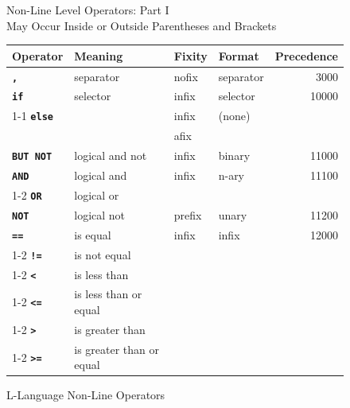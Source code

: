 \documentclass[12pt]{article}
\newcommand{\ttkey}[1]{{\tt \bfseries #1}}
\newlength{\figurewidth}
\newenvironment{boxedfigure}[1][!btp]%
	{\begin{figure}[#1]
	 \begin{lrbox}{\figurebox}
	 \begin{minipage}{\figurewidth}

	 \vspace*{1ex}}%
	{
	 \vspace*{1ex}

	 \end{minipage}
	 \end{lrbox}

	 \centering
	 \fbox{\hspace*{0.1in}\usebox{\figurebox}\hspace*{0.1in}}
	 \end{figure}}
\begin{document}
\begin{boxedfigure}[!p]
\begin{center}
Non-Line Level Operators: Part I \\
May Occur Inside or Outside Parentheses and Brackets
\\[1ex]
\begin{tabular}{|l|l|l|l|r|}
\hline
Operator & Meaning & Fixity & Format & Precedence \\
\hline
\ttkey{,} & separator & nofix & separator & 3000
\\\hline
\ttkey{if} & selector & infix & selector & 10000
\\\cline{1-1}\cline{3-4}
\ttkey{else} & & infix & (none) & \\
             & & afix & &
\\\hline
\ttkey{BUT NOT} & logical and not & infix & binary & 11000
\\\hline
\ttkey{AND} & logical and & infix & n-ary & 11100
\\\cline{1-2}
\ttkey{OR}  & logical or  & & &
\\\hline
\ttkey{NOT}  & logical not & prefix & unary & 11200
\\\hline
\ttkey{==}  & is equal & infix & infix & 12000
\\\cline{1-2}
\ttkey{!=}  & is not equal & & &
\\\cline{1-2}
\ttkey{<}  & is less than & & &
\\\cline{1-2}
\ttkey{<=}  & is less than or equal & & &
\\\cline{1-2}
\ttkey{>}  & is greater than & & &
\\\cline{1-2}
\ttkey{>=}  & is greater than or equal & & &
\\\hline

\end{tabular}
\end{center}

\caption{L-Language Non-Line Operators}
\label{L-LANGUAGE-NON-LINE-OPERATORS-1}
\end{boxedfigure}

\clearpage
\end{document}
